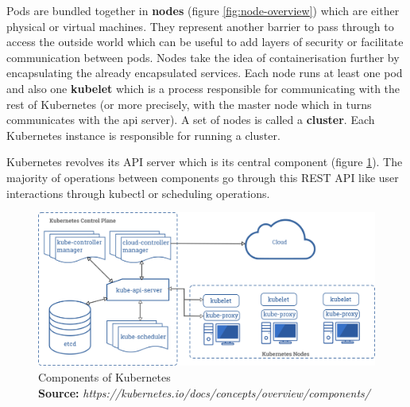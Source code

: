 \documentclass[12pt, a4paper]{memoir}
\newcommand*{\captionsource}[2]{%
    \caption[{#1}]{%
        #1%
        \\\hspace{\linewidth}%
	\textbf{Source:} \textit{#2}%
    }%
}
\begin{document}
Pods are bundled together in \textbf{nodes} (figure \ref{fig:node-overview})
which are either physical or virtual machines. They represent another barrier
to pass through to access the outside world which can be useful to add layers
of security or facilitate communication between pods. Nodes take the idea of
containerisation further by encapsulating the already encapsulated services.
Each node runs at least one pod and also one \textbf{kubelet} which is a
process responsible for communicating with the rest of Kubernetes (or more
precisely, with the master node which in turns communicates with the api
server). A set of nodes is called a \textbf{cluster}. Each Kubernetes instance
is responsible for running a cluster.

Kubernetes revolves its API server which is its central component (figure
\ref{fig:kube-components}). The majority of operations between components go
through this REST API like user interactions through kubectl or scheduling
operations.

\begin{figure}[h]
	\centering
	\includegraphics[width=\textwidth]{./imgs/components-of-kubernetes.png}
	\captionsource{Components of Kubernetes}{https://kubernetes.io/docs/concepts/overview/components/}
	\label{fig:kube-components}
\end{figure}
\end{document}

